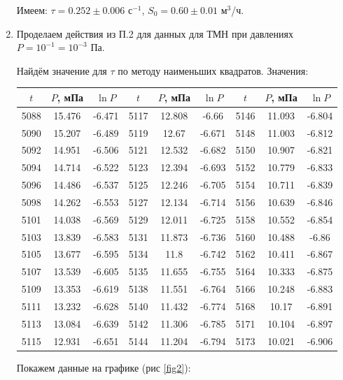 \documentclass[a4paper,12pt]{article} %
\begin{document}
\begin{enumerate}
Имеем: $\tau = 0.252 \pm 0.006$ с$^{-1}$, $S_0 = 0.60 \pm 0.01$ м$^3$/ч.

\item Проделаем действия из П.2 для данных для ТМН при давлениях $P = 10^{-1} = 10^{-3}$ Па.

Найдём значение для $\tau$ по методу наименьших квадратов. Значения:

\begin{center}
\begin{tabular}{|c|c|c|c|c|c|c|c|c|}
\hline 
$t$ & $P$, мПа & $\ln P$ & $t$ & $P$, мПа & $\ln P$ & $t$ & $P$, мПа & $\ln P$ \\ 
\hline 
5088 & 15.476 & -6.471 & 5117 & 12.808 & -6.66 & 5146 & 11.093 & -6.804 \\
\hline
5090 & 15.207 & -6.489 & 5119 & 12.67 & -6.671 & 5148 & 11.003 & -6.812 \\
\hline
5092 & 14.951 & -6.506 & 5121 & 12.532 & -6.682 & 5150 & 10.907 & -6.821 \\
\hline
5094 & 14.714 & -6.522 & 5123 & 12.394 & -6.693 & 5152 & 10.779 & -6.833 \\
\hline
5096 & 14.486 & -6.537 & 5125 & 12.246 & -6.705 & 5154 & 10.711 & -6.839 \\
\hline
5098 & 14.262 & -6.553 & 5127 & 12.134 & -6.714 & 5156 & 10.639 & -6.846 \\
\hline
5101 & 14.038 & -6.569 & 5129 & 12.011 & -6.725 & 5158 & 10.552 & -6.854 \\
\hline
5103 & 13.839 & -6.583 & 5131 & 11.873 & -6.736 & 5160 & 10.488 & -6.86 \\
\hline
5105 & 13.677 & -6.595 & 5134 & 11.8 & -6.742 & 5162 & 10.411 & -6.867 \\
\hline
5107 & 13.539 & -6.605 & 5135 & 11.655 & -6.755 & 5164 & 10.333 & -6.875 \\
\hline
5109 & 13.353 & -6.619 & 5138 & 11.551 & -6.764 & 5166 & 10.248 & -6.883 \\
\hline
5111 & 13.232 & -6.628 & 5140 & 11.432 & -6.774 & 5168 & 10.17 & -6.891 \\
\hline
5113 & 13.084 & -6.639 & 5142 & 11.306 & -6.785 & 5171 & 10.104 & -6.897 \\
\hline
5115 & 12.931 & -6.651 & 5144 & 11.204 & -6.794 & 5173 & 10.021 & -6.906 \\
\hline
\end{tabular} 
\end{center}

Покажем данные на графике (рис \ref{fig2}):


\end{enumerate}
\end{document}
